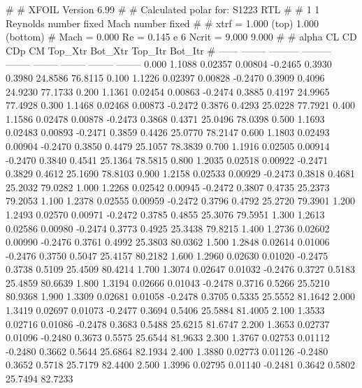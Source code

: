 #  
#       XFOIL         Version 6.99
#  
# Calculated polar for: S1223 RTL                                       
#  
# 1 1 Reynolds number fixed          Mach number fixed         
#  
# xtrf =   1.000 (top)        1.000 (bottom)  
# Mach =   0.000     Re =     0.145 e 6     Ncrit =   9.000  9.000
#  
#   alpha    CL        CD       CDp       CM     Top_Xtr  Bot_Xtr  Top_Itr  Bot_Itr
#  ------ -------- --------- --------- -------- -------- -------- -------- --------
   0.000   1.1088   0.02357   0.00804  -0.2465   0.3930   0.3980  24.8586  76.8115
   0.100   1.1226   0.02397   0.00828  -0.2470   0.3909   0.4096  24.9230  77.1733
   0.200   1.1361   0.02454   0.00863  -0.2474   0.3885   0.4197  24.9965  77.4928
   0.300   1.1468   0.02468   0.00873  -0.2472   0.3876   0.4293  25.0228  77.7921
   0.400   1.1586   0.02478   0.00878  -0.2473   0.3868   0.4371  25.0496  78.0398
   0.500   1.1693   0.02483   0.00893  -0.2471   0.3859   0.4426  25.0770  78.2147
   0.600   1.1803   0.02493   0.00904  -0.2470   0.3850   0.4479  25.1057  78.3839
   0.700   1.1916   0.02505   0.00914  -0.2470   0.3840   0.4541  25.1364  78.5815
   0.800   1.2035   0.02518   0.00922  -0.2471   0.3829   0.4612  25.1690  78.8103
   0.900   1.2158   0.02533   0.00929  -0.2473   0.3818   0.4681  25.2032  79.0282
   1.000   1.2268   0.02542   0.00945  -0.2472   0.3807   0.4735  25.2373  79.2053
   1.100   1.2378   0.02555   0.00959  -0.2472   0.3796   0.4792  25.2720  79.3901
   1.200   1.2493   0.02570   0.00971  -0.2472   0.3785   0.4855  25.3076  79.5951
   1.300   1.2613   0.02586   0.00980  -0.2474   0.3773   0.4925  25.3438  79.8215
   1.400   1.2736   0.02602   0.00990  -0.2476   0.3761   0.4992  25.3803  80.0362
   1.500   1.2848   0.02614   0.01006  -0.2476   0.3750   0.5047  25.4157  80.2182
   1.600   1.2960   0.02630   0.01020  -0.2475   0.3738   0.5109  25.4509  80.4214
   1.700   1.3074   0.02647   0.01032  -0.2476   0.3727   0.5183  25.4859  80.6639
   1.800   1.3194   0.02666   0.01043  -0.2478   0.3716   0.5266  25.5210  80.9368
   1.900   1.3309   0.02681   0.01058  -0.2478   0.3705   0.5335  25.5552  81.1642
   2.000   1.3419   0.02697   0.01073  -0.2477   0.3694   0.5406  25.5884  81.4005
   2.100   1.3533   0.02716   0.01086  -0.2478   0.3683   0.5488  25.6215  81.6747
   2.200   1.3653   0.02737   0.01096  -0.2480   0.3673   0.5575  25.6544  81.9633
   2.300   1.3767   0.02753   0.01112  -0.2480   0.3662   0.5644  25.6864  82.1934
   2.400   1.3880   0.02773   0.01126  -0.2480   0.3652   0.5718  25.7179  82.4400
   2.500   1.3996   0.02795   0.01140  -0.2481   0.3642   0.5802  25.7494  82.7233
